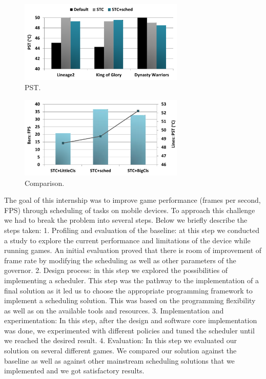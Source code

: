 \begin{figure}[t]%
	\centering
	\includegraphics[width=0.7\textwidth]{figures/PST.pdf}
	\caption{PST.}
	\label{fig:PST}
\end{figure}


\begin{figure}[t]%
	\centering
	\includegraphics[width=0.7\textwidth]{figures/intern_comparison.pdf}
	\caption{Comparison.}
	\label{fig:int_comparison}
\end{figure}


The goal of this internship was to improve game performance (frames per second, FPS) through scheduling of tasks on mobile devices. To approach this challenge we had to break the problem into several steps. Below we briefly describe the steps taken:
1.	Profiling and evaluation of the baseline: at this step we conducted a study to explore the current performance and limitations of the device while running games. An initial evaluation proved that there is room of improvement of frame rate by modifying the scheduling as well as other parameters of the governor.
2.	Design process: in this step we explored the possibilities of implementing a scheduler. This step was the pathway to the implementation of a final solution as it led us to choose the appropriate programming framework to implement a scheduling solution. This was based on the programming flexibility as well as on the available tools and resources.
3.	Implementation and experimentation: In this step, after the design and software core implementation was done, we experimented with different policies and tuned the scheduler until we reached the desired result.
4.	Evaluation: In this step we evaluated our solution on several different games. We compared our solution against the baseline as well as against other mainstream scheduling solutions that we implemented and we got satisfactory results.

